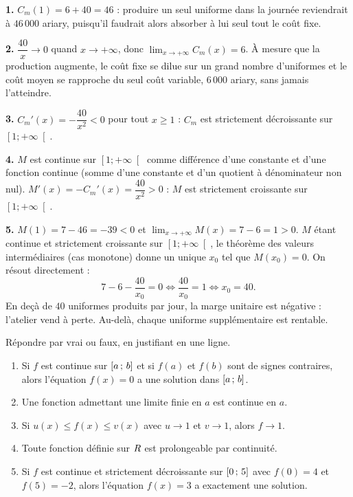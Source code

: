 \begin{corrige}
\textbf{1.} $C_{m}(1) = 6 + 40 = 46$ : produire un seul uniforme dans la
journée reviendrait à $46\,000$ ariary, puisqu'il faudrait alors absorber à
lui seul tout le coût fixe.

\textbf{2.} $\dfrac{40}{x} \to 0$ quand $x \to +\infty$, donc
$\lim_{x \to +\infty} C_{m}(x) = 6$. À mesure que la production augmente, le
coût fixe se dilue sur un grand nombre d'uniformes et le coût moyen se
rapproche du seul coût variable, $6\,000$ ariary, sans jamais l'atteindre.

\textbf{3.} $C_{m}'(x) = -\dfrac{40}{x^{2}} < 0$ pour tout $x \geq 1$ : $C_{m}$
est strictement décroissante sur $\left[1;+\infty\right[$.

\textbf{4.} $M$ est continue sur $\left[1;+\infty\right[$ comme différence
d'une constante et d'une fonction continue (somme d'une constante et d'un
quotient à dénominateur non nul). $M'(x) = -C_{m}'(x) = \dfrac{40}{x^{2}} > 0$ :
$M$ est strictement croissante sur $\left[1;+\infty\right[$.

\textbf{5.} $M(1) = 7 - 46 = -39 < 0$ et $\lim_{x\to+\infty} M(x) = 7 - 6 = 1 > 0$.
$M$ étant continue et strictement croissante sur $\left[1;+\infty\right[$, le
théorème des valeurs intermédiaires (cas monotone) donne un unique $x_{0}$ tel
que $M(x_{0}) = 0$. On résout directement :
\[
  7 - 6 - \frac{40}{x_{0}} = 0
  \iff \frac{40}{x_{0}} = 1
  \iff x_{0} = 40 .
\]
En deçà de $40$ uniformes produits par jour, la marge unitaire est négative :
l'atelier vend à perte. Au-delà, chaque uniforme supplémentaire est
rentable.
\end{corrige}

\begin{jemeteste}
Répondre par vrai ou faux, en justifiant en une ligne.

\begin{enumerate}[label=\textbf{\arabic*.}, leftmargin=*, itemsep=0.28em]
  \item Si $f$ est continue sur $\left[a\,;\,b\right]$ et si $f(a)$ et $f(b)$
        sont de signes contraires, alors l'équation $f(x) = 0$ a une solution
        dans $\left[a\,;\,b\right]$.
  \item Une fonction admettant une limite finie en $a$ est continue en $a$.
  \item Si $u(x) \leq f(x) \leq v(x)$ avec $u \to 1$ et $v \to 1$, alors
        $f \to 1$.
  \item Toute fonction définie sur $R$ est prolongeable par continuité.
  \item Si $f$ est continue et strictement décroissante sur
        $\left[0\,;\,5\right]$ avec $f(0) = 4$ et $f(5) = -2$, alors l'équation
        $f(x) = 3$ a exactement une solution.
\end{enumerate}
\end{jemeteste}

